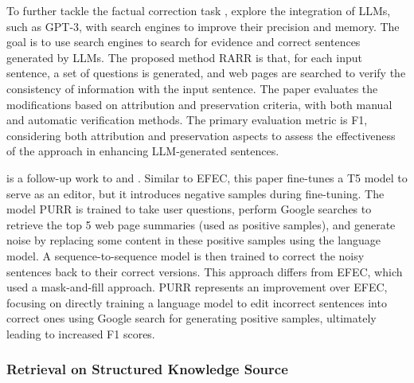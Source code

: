 
To further tackle the factual correction task \citep{thorne2021evidence}, \citet{gao2023rarr} explore the integration of LLMs, such as GPT-3, with search engines to improve their precision and memory. The goal is to use search engines to search for evidence and correct sentences generated by LLMs. The proposed method RARR is that, for each input sentence, a set of questions is generated, and web pages are searched to verify the consistency of information with the input sentence. The paper evaluates the modifications based on attribution and preservation criteria, with both manual and automatic verification methods. The primary evaluation metric is F1, considering both attribution and preservation aspects to assess the effectiveness of the approach in enhancing LLM-generated sentences.

\citet{chen2023purr} is a follow-up work to \citep{gao2023rarr} and \citep{thorne2021evidence}. Similar to EFEC, this paper fine-tunes a T5 model to serve as an editor, but it introduces negative samples during fine-tuning. The model PURR is trained to take user questions, perform Google searches to retrieve the top 5 web page summaries (used as positive samples), and generate noise by replacing some content in these positive samples using the language model. A sequence-to-sequence model is then trained to correct the noisy sentences back to their correct versions. This approach differs from EFEC, which used a mask-and-fill approach. PURR represents an improvement over EFEC, focusing on directly training a language model to edit incorrect sentences into correct ones using Google search for generating positive samples, ultimately leading to increased F1 scores.

\subsubsection{Retrieval on Structured Knowledge Source}
\label{sec:enhace_rag_kg}


